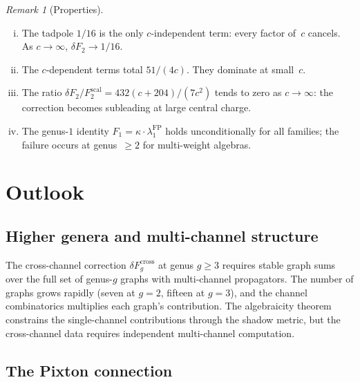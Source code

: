 \documentclass[11pt,reqno]{amsart}
\theoremstyle{definition}
\theoremstyle{remark}
\newtheorem{remark}[theorem]{Remark}
\numberwithin{equation}{section}
\begin{document}
\begin{remark}[Properties]\label{rem:cross-channel}
\leavevmode
\begin{enumerate}[(i)]
\item The tadpole $1/16$ is the only $c$-independent term:
 every factor of~$c$ cancels. As $c \to \infty$,
 $\delta F_2 \to 1/16$.

\item The $c$-dependent terms total $51/(4c)$. They
 dominate at small~$c$.

\item The ratio
 $\delta F_2/F_2^{\mathrm{scal}} = 432(c+204)/(7c^2)$
 tends to zero as $c \to \infty$: the correction becomes
 subleading at large central charge.

\item The genus-$1$ identity
 $F_1 = \kappa \cdot \lambda_1^{\mathrm{FP}}$ holds
 unconditionally for all families; the failure occurs
 at genus~$\ge 2$ for multi-weight algebras.
\end{enumerate}
\end{remark}



\section{Outlook}\label{sec:outlook}

\subsection{Higher genera and multi-channel
structure}\label{subsec:outlook-genera}

The cross-channel correction $\delta F_g^{\mathrm{cross}}$
at genus $g \ge 3$ requires stable graph sums over
the full set of genus-$g$ graphs with multi-channel
propagators. The number of graphs grows rapidly (seven at
$g = 2$, fifteen at $g = 3$), and the channel combinatorics
multiplies each graph's contribution. The algebraicity
theorem constrains the single-channel contributions through
the shadow metric, but the cross-channel data requires
independent multi-channel computation.

\subsection{The Pixton
connection}\label{subsec:outlook-pixton}
\end{document}
